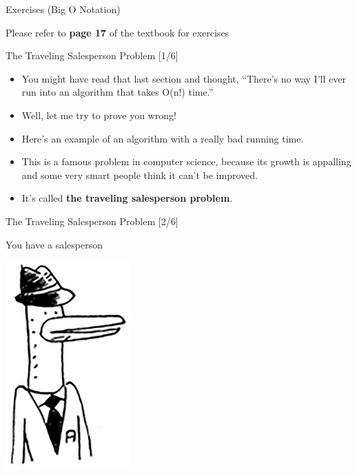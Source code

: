\documentclass[ignorenonframetext,]{beamer}
\providecommand{\tightlist}{%
  \setlength{\itemsep}{0pt}\setlength{\parskip}{0pt}}
\begin{document}
\begin{frame}{Exercises (Big O Notation)}
\protect\hypertarget{exercises-big-o-notation}{}

Please refer to \textbf{page 17} of the textbook for exercises

\end{frame}

\begin{frame}{The Traveling Salesperson Problem {[}1/6{]}}
\protect\hypertarget{the-traveling-salesperson-problem-16}{}

\begin{itemize}
\tightlist
\item
  You might have read that last section and thought, ``There's no way
  I'll ever run into an algorithm that takes O(n!) time.''
\item
  Well, let me try to prove you wrong!
\item
  Here's an example of an algorithm with a really bad running time.
\item
  This is a famous problem in computer science, because its growth is
  appalling and some very smart people think it can't be improved.
\item
  It's called \textbf{the traveling salesperson problem}.
\end{itemize}

\end{frame}

\begin{frame}{The Traveling Salesperson Problem {[}2/6{]}}
\protect\hypertarget{the-traveling-salesperson-problem-26}{}

You have a salesperson

\includegraphics{./Chapter01-figure/travelling_salesperson_01.png}

\end{frame}
\end{document}
